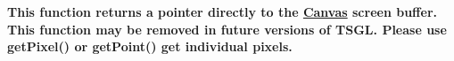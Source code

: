 
\begin{DoxyRefList}
\item[Member \mbox{\hyperlink{classtsgl_1_1_canvas_a71f072dd82ca3b5cecfd65cde6d8a226}{tsgl::Canvas::get\+Screen\+Buffer}} ()]\label{deprecated__deprecated000001}%
%
{\bfseries{This function returns a pointer directly to the \mbox{\hyperlink{classtsgl_1_1_canvas}{Canvas}}\textquotesingle{} screen buffer. This function may be removed in future versions of T\+S\+GL. Please use get\+Pixel() or get\+Point() get individual pixels. }}
\end{DoxyRefList}